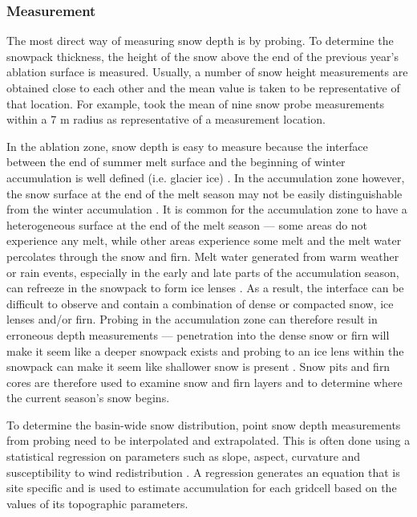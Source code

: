 \documentclass{sfuthesis}
\begin{document}
\subsubsection{Measurement}
The most direct way of measuring snow depth is by probing. To determine the snowpack thickness, the height of the snow above the end of the previous year's ablation surface is measured. Usually, a number of snow height measurements are obtained close to each other and the mean value is taken to be representative of that location. For example, \cite{Machguth2006} took the mean of nine snow probe measurements within a 7 m radius as representative of a measurement location.  

In the ablation zone, snow depth is easy to measure because the interface between the end of summer melt surface and the beginning of winter accumulation is well defined (i.e. glacier ice) \citep{McGrath2015}. In the accumulation zone however, the snow surface at the end of the melt season may not be easily distinguishable from the winter accumulation \citep{Grunewald2010}. It is common for the accumulation zone to have a heterogeneous surface at the end of the melt season --- some areas do not experience any melt,  while other areas experience some melt and the melt water percolates through the snow and firn. Melt water generated from warm weather or rain events, especially in the early and late parts of the accumulation season, can refreeze in the snowpack to form ice lenses \citep{Sold2014}. As a result, the interface can be difficult to observe and contain a combination of dense or compacted snow, ice lenses and/or firn.  Probing in the accumulation zone can therefore result in erroneous depth measurements --- penetration into the dense snow or firn will make it seem like a deeper snowpack exists and probing to an ice lens within the snowpack can make it seem like shallower snow is present \citep{Sold2013}. Snow pits and firn cores are therefore used to examine snow and firn layers and to determine where the current season's snow begins.

To determine the basin-wide snow distribution, point snow depth measurements from probing need to be interpolated and extrapolated. This is often done using a statistical regression on parameters such as slope, aspect, curvature and susceptibility to wind redistribution \citep[e.g.][]{Wheler2014,McGrath2015}. A regression generates an equation that is site specific and is used to estimate accumulation for each gridcell based on the values of its topographic parameters. 
\end{document}
